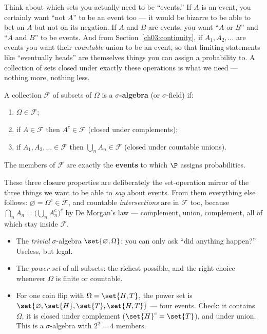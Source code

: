\begin{intuitionbox}
Think about which sets you actually need to be ``events.'' If $A$ is an event,
you certainly want ``not $A$'' to be an event too --- it would be bizarre to be
able to bet on $A$ but not on its negation. If $A$ and $B$ are events, you want
``$A$ or $B$'' and ``$A$ and $B$'' to be events. And from
Section~\ref{ch03:continuity}, if $A_1, A_2, \dots$ are events you want their
\emph{countable} union to be an event, so that limiting statements like
``eventually heads'' are themselves things you can assign a probability to. A
collection of sets closed under exactly these operations is what we need ---
nothing more, nothing less.
\end{intuitionbox}

\begin{definition}
\label{ch03:def-sigma-algebra}
A collection $\mathcal{F}$ of subsets of $\Omega$ is a \textbf{$\sigma$-algebra}
(or $\sigma$-field) if:
\begin{enumerate}
\item $\Omega \in \mathcal{F}$;
\item if $A \in \mathcal{F}$ then $A^c \in \mathcal{F}$ (closed under
complements);
\item if $A_1, A_2, \dots \in \mathcal{F}$ then $\bigcup_{n} A_n \in \mathcal{F}$
(closed under countable unions).
\end{enumerate}
The members of $\mathcal{F}$ are exactly the \textbf{events} to which $\P$ assigns
probabilities.
\end{definition}

These three closure properties are deliberately the set-operation mirror of the
three things we want to be able to \emph{say} about events. From them everything
else follows: $\varnothing = \Omega^c \in \mathcal{F}$, and countable
\emph{intersections} are in $\mathcal{F}$ too, because $\bigcap_n A_n =
\big(\bigcup_n A_n^c\big)^c$ by De Morgan's law --- complement, union,
complement, all of which stay inside $\mathcal{F}$.

\begin{example}
\label{ch03:ex-sigma}
\begin{itemize}
\item The \emph{trivial} $\sigma$-algebra $\set{\varnothing, \Omega}$: you can
only ask ``did anything happen?'' Useless, but legal.
\item The \emph{power set} of all subsets: the richest possible, and the right
choice whenever $\Omega$ is finite or countable.
\item For one coin flip with $\Omega = \set{H,T}$, the power set is
$\set{\varnothing, \set{H}, \set{T}, \set{H,T}}$ --- four events. Check: it
contains $\Omega$, it is closed under complement ($\set{H}^c = \set{T}$), and
under union. This is a $\sigma$-algebra with $2^2 = 4$ members.
\end{itemize}
\end{example}


